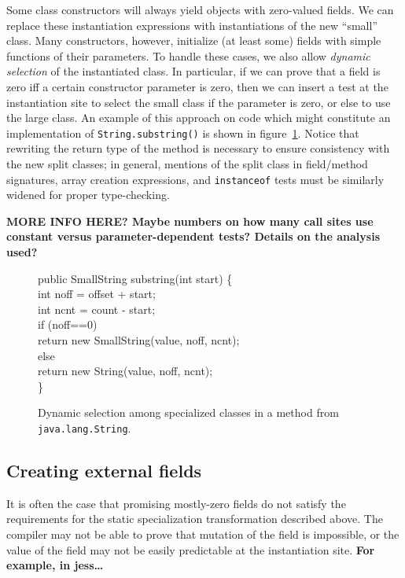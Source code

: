 \documentclass[preprint]{acmconf}
\begin{document}
Some class constructors will always yield objects with zero-valued fields.
We can replace these instantiation expressions
with instantiations of the new ``small'' class.  Many constructors,
however, initialize (at least some) fields with simple functions of their
parameters.  To handle these cases, we also allow {\it dynamic
  selection} of the instantiated class.  In particular, if we can
prove that a field is zero iff a certain constructor parameter is
zero, then we can insert a test at the instantiation site to select
the small class if the parameter is zero, or else to use the large class.
An example of this approach on code which might constitute an
implementation of {\tt String.substring()} is shown in
figure~\ref{fig:dyn-select}.  Notice that rewriting the return type of the
method is necessary to ensure consistency with the new split
classes; in general, mentions of the split class in field/method signatures,
array creation expressions, and {\tt instanceof} tests must be
similarly widened for proper type-checking.

{\bf MORE INFO HERE? Maybe numbers on how many call sites use constant
  versus parameter-dependent tests?  Details on the analysis used?}

\begin{figure}
\begin{samplecode}
public SmallString substring(int start) \{\\
\>int noff = offset + start;\\
\>int ncnt = count - start;\\
\>if (noff==0)\\
\>\>return new SmallString(value, noff, ncnt);\\
\>else\\
\>\>return new String(value, noff, ncnt);\\
\}\\
\end{samplecode}
\caption{Dynamic selection among specialized classes in a method
  from {\tt java.lang.String}.}
\label{fig:dyn-select}
\end{figure}

\subsection{Creating external fields}
It is often the case that promising mostly-zero fields do not satisfy
the requirements for the static specialization transformation
described above.  The compiler may not be able to prove that mutation
of the field is impossible, or the value of the field may not be
easily predictable at the instantiation site.
{\bf For example, in jess\ldots } %
\end{document}
